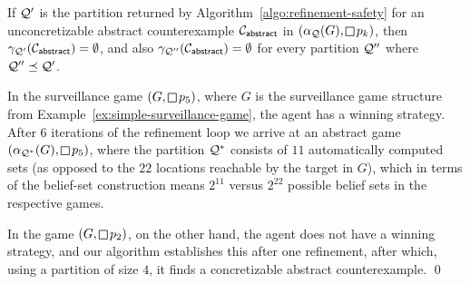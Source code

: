 \begin{theorem}If $\mathcal{Q}'$ is the partition returned by Algorithm~\ref{algo:refinement-safety} for an unconcretizable abstract counterexample $\mathcal{C}_{\mathsf{abstract}}$ in $(\alpha_\part(G),\LTLglobally p_k)$, then $\gamma_{\mathcal{Q}'}(\mathcal{C}_{\mathsf{abstract}}) = \emptyset$, and also $\gamma_{\mathcal{Q}''}(\mathcal{C}_{\mathsf{abstract}}) = \emptyset$ for every partition $\mathcal{Q}''$ where $\mathcal{Q}'' \preceq \mathcal{Q}'$.
\end{theorem}

\begin{example}\label{ex:simple-safety-realizability}
In the surveillance game $(G,\LTLglobally p_5)$, where $G$ is the surveillance game structure from Example~\ref{ex:simple-surveillance-game}, the agent has a winning strategy. After $6$ iterations of the refinement loop we arrive at an abstract game $(\alpha_{\part^*}(G),\LTLglobally p_5)$, where the partition $\mathcal{Q}^*$ consists of $11$ automatically computed sets (as opposed to the $22$ locations reachable by the target in $G$), which in terms of the belief-set construction means $2^{11}$ versus $2^{22}$ possible belief sets in the respective games.

In the game $(G,\LTLglobally p_2)$, on the other hand, the agent does not have a winning strategy, and our algorithm establishes this after one refinement, after which, using a partition of size $4$,  it finds a concretizable abstract counterexample.
\qed
\end{example}